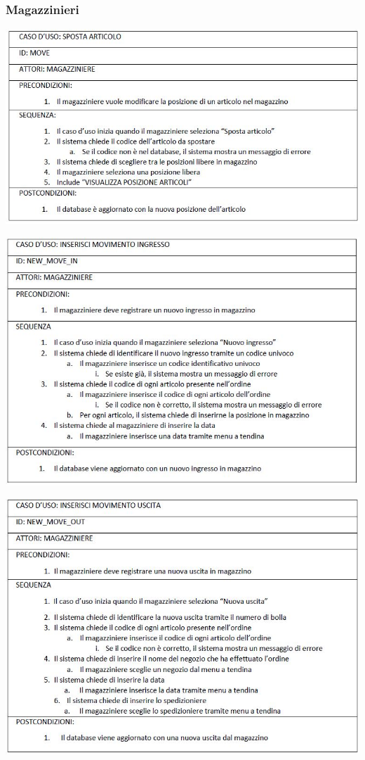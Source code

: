 \documentclass[a4paper]{article}
\begin{document}
	\subsubsection{Magazzinieri}
	\begin{center}
		\includegraphics [scale=0.5] {move}\\
	\end{center}
		\begin{center}
		\includegraphics [scale=0.5] {new_move_in}\\
	\end{center}
	\begin{center}
	\includegraphics [scale=0.5] {new_move_out}\\
	\end{center}
	
\end{document}
